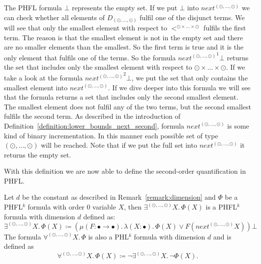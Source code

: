 \begin{remark}
\label{remark:lower_bounds_next_second}
	The PHFL formula $\bot$ represents the empty set. If we put $\bot$ into $next^{(\odot, \dots, \odot)}$ we can check whether all elements of $D_{(\odot, \dots, \odot)}$ fulfil one 
	of the disjunct terms. We will see that only the smallest element with respect to $<^{\odot\times\dots\times\odot}$ fulfils the first term. The reason is that the smallest element is not in the empty set and there are no smaller elements than the smallest.
	So the first term is true and it is the only element that fulfils one of the terms. So the formula ${next^{(\odot, \dots, \odot)}}^1 \bot$ returns the set that includes only the smallest 
	element with respect to $\odot \times \dots \times \odot$. If we take a look at the formula ${next^{(\odot, \dots, \odot)}}^2 \bot$, we put the set that only contains the smallest element into 
	$next^{(\odot, \dots, \odot)}$. If we dive deeper into this formula we will see that the formula returns a set that includes only the second smallest element. The smallest element does not 
	fulfil any of the two terms, but the second smallest fulfils the second term. As described in the introduction of Definition~\ref{definition:lower_bounds_next_second}, formula $next^{(\odot, 
	\dots, \odot)}$ is some kind of binary incrementation. In this manner each possible set of type $(\odot, \dots, \odot)$ will be reached. Note that if we put the full set into $next^{(\odot, 
	\dots, \odot)}$ it returns the empty set.
\end{remark}

With this definition we are now able to define the second-order quantification in PHFL.

\begin{definition}
    \label{definition:existential_quantification_second}
    Let $d$ be the constant as described in Remark~\ref{remark:dimension} and $\Phi$ be a PHFL$^k$ formula with order $0$ variable $X$, then $\exists^{(\odot, \dots, \odot)}X .\,\Phi(X)$
    is a PHFL$^k$ formula with dimension $d$ defined as:
    \[\exists^{(\odot, \dots, \odot)}X.\, \Phi(X) \coloneqq (\mu (F \colon \bullet \rightarrow \bullet).\, \lambda (X
    \colon \bullet).\, \Phi(X) \vee F(next^{(\odot, \dots, \odot)} X)) \bot
    \]
    The formula $\forall^{(\odot, \dots, \odot)}X.\,\Phi$ is also a PHL$^k$ formula with dimension $d$ and is defined as
    \[\forall^{(\odot, \dots, \odot)}X.\,\Phi(X) \coloneqq \neg \exists^{(\odot, \dots, \odot)}X .\,\neg\Phi(X).\]
\end{definition}

